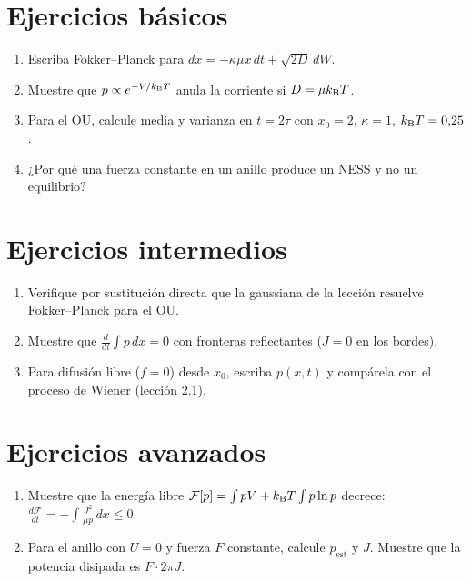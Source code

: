 \documentclass[11pt,a4paper]{article}
\begin{document}

\section{Ejercicios básicos}
\begin{enumerate}[label=\textbf{B\arabic*.}]
\item Escriba Fokker--Planck para $dx=-\kappa\mu x\,dt+\sqrt{2D}\,dW$.
\item Muestre que $p\propto e^{-V/k_{\mathrm B} T}$ anula la corriente si $D=\mu k_{\mathrm B} T$.
\item Para el OU, calcule media y varianza en $t=2\tau$ con $x_0=2$, $\kappa=1$, $k_{\mathrm B} T=0{,}25$.
\item ¿Por qué una fuerza constante en un anillo produce un NESS y no un equilibrio?
\end{enumerate}

\section{Ejercicios intermedios}
\begin{enumerate}[label=\textbf{I\arabic*.}]
\item Verifique por sustitución directa que la gaussiana de la lección resuelve Fokker--Planck para el OU.
\item Muestre que $\frac{d}{dt}\int p\,dx=0$ con fronteras reflectantes ($J=0$ en los bordes).
\item Para difusión libre ($f=0$) desde $x_0$, escriba $p(x,t)$ y compárela con el proceso de Wiener (lección 2.1).
\end{enumerate}

\section{Ejercicios avanzados}
\begin{enumerate}[label=\textbf{A\arabic*.}]
\item Muestre que la energía libre $\mathcal F[p]=\int pV+k_{\mathrm B} T\int p\ln p$ decrece: $\frac{d\mathcal F}{dt}=-\int\frac{J^2}{\mu p}\,dx\le0$.
\item Para el anillo con $U=0$ y fuerza $F$ constante, calcule $p_{\text{est}}$ y $J$. Muestre que la potencia disipada es $F\cdot2\pi J$.
\end{enumerate}
\end{document}
